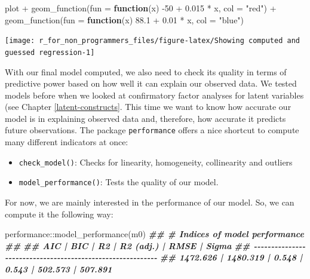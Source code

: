 \documentclass[
]{book}
\newenvironment{Shaded}{\begin{snugshade}}{\end{snugshade}}
\newcommand{\AttributeTok}[1]{\textcolor[rgb]{0.77,0.63,0.00}{#1}}
\newcommand{\ControlFlowTok}[1]{\textcolor[rgb]{0.13,0.29,0.53}{\textbf{#1}}}
\newcommand{\DecValTok}[1]{\textcolor[rgb]{0.00,0.00,0.81}{#1}}
\newcommand{\DocumentationTok}[1]{\textcolor[rgb]{0.56,0.35,0.01}{\textbf{\textit{#1}}}}
\newcommand{\FloatTok}[1]{\textcolor[rgb]{0.00,0.00,0.81}{#1}}
\newcommand{\FunctionTok}[1]{\textcolor[rgb]{0.00,0.00,0.00}{#1}}
\newcommand{\NormalTok}[1]{#1}
\newcommand{\SpecialCharTok}[1]{\textcolor[rgb]{0.00,0.00,0.00}{#1}}
\newcommand{\StringTok}[1]{\textcolor[rgb]{0.31,0.60,0.02}{#1}}
\begin{document}
\begin{Shaded}
\begin{Highlighting}[]
\NormalTok{plot }\SpecialCharTok{+}
  \FunctionTok{geom\_function}\NormalTok{(}\AttributeTok{fun =} \ControlFlowTok{function}\NormalTok{(x) }\SpecialCharTok{{-}}\DecValTok{50} \SpecialCharTok{+} \FloatTok{0.015} \SpecialCharTok{*}\NormalTok{ x, }\AttributeTok{col =} \StringTok{"red"}\NormalTok{) }\SpecialCharTok{+}
    \FunctionTok{geom\_function}\NormalTok{(}\AttributeTok{fun =} \ControlFlowTok{function}\NormalTok{(x) }\FloatTok{88.1} \SpecialCharTok{+} \FloatTok{0.01} \SpecialCharTok{*}\NormalTok{ x, }\AttributeTok{col =} \StringTok{"blue"}\NormalTok{)}
\end{Highlighting}
\end{Shaded}

\begin{center}\texttt{[image: r\_for\_non\_programmers\_files/figure-latex/Showing computed and guessed regression-1]} \end{center}

With our final model computed, we also need to check its quality in terms of predictive power based on how well it can explain our observed data. We tested models before when we looked at confirmatory factor analyses for latent variables (see Chapter \ref{latent-constructs}. This time we want to know how accurate our model is in explaining observed data and, therefore, how accurate it predicts future observations. The package \texttt{performance} offers a nice shortcut to compute many different indicators at once:

\begin{itemize}
\item
  \texttt{check\_model()}: Checks for linearity, homogeneity, collinearity and outliers
\item
  \texttt{model\_performance()}: Tests the quality of our model.
\end{itemize}

For now, we are mainly interested in the performance of our model. So, we can compute it the following way:

\begin{Shaded}
\begin{Highlighting}[]
\NormalTok{performance}\SpecialCharTok{::}\FunctionTok{model\_performance}\NormalTok{(m0)}
\DocumentationTok{\#\# \# Indices of model performance}
\DocumentationTok{\#\# }
\DocumentationTok{\#\# AIC      |      BIC |    R2 | R2 (adj.) |    RMSE |   Sigma}
\DocumentationTok{\#\# {-}{-}{-}{-}{-}{-}{-}{-}{-}{-}{-}{-}{-}{-}{-}{-}{-}{-}{-}{-}{-}{-}{-}{-}{-}{-}{-}{-}{-}{-}{-}{-}{-}{-}{-}{-}{-}{-}{-}{-}{-}{-}{-}{-}{-}{-}{-}{-}{-}{-}{-}{-}{-}{-}{-}{-}{-}{-}{-}}
\DocumentationTok{\#\# 1472.626 | 1480.319 | 0.548 |     0.543 | 502.573 | 507.891}
\end{Highlighting}
\end{Shaded}
\end{document}
